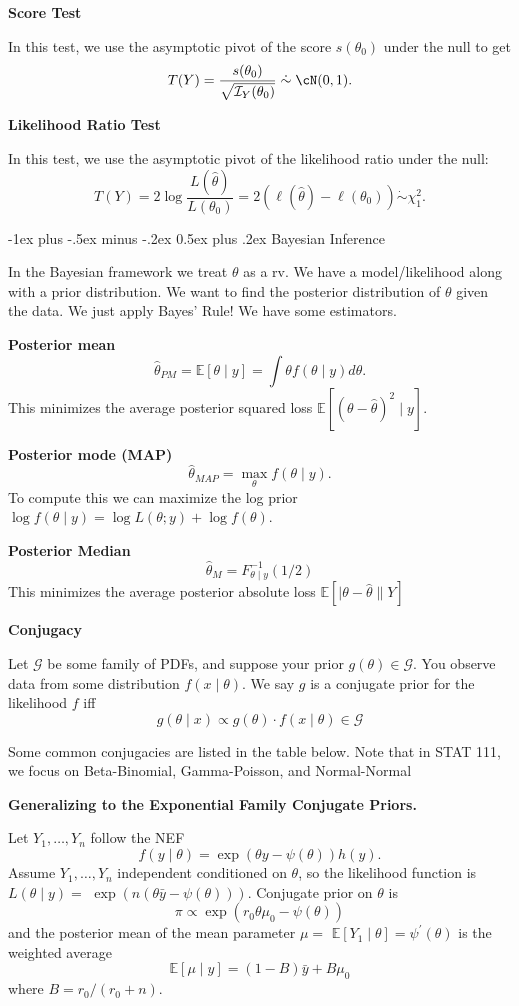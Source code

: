 \documentclass[10pt,landscape]{article}
\makeatletter
\renewcommand{\section}{\@startsection{section}{1}{0mm}%
                                {-1ex plus -.5ex minus -.2ex}%
                                {0.5ex plus .2ex}%
                                {\normalfont\large\bfseries}}
\makeatother
\begin{document}
\begin{multicols*}{3}
\textbf{Score Test}

In this test, we use the asymptotic pivot of the score $s(\theta_0)$ under the null to get $$T(Y)=\frac{s(\theta_0)}{\sqrt{\mathcal{I}_Y(\theta_0)}}\mathrel{\dot\sim} \cN(0,1).$$

\textbf{Likelihood Ratio Test}

In this test, we use the asymptotic pivot of the likelihood ratio under the null: $$T(Y)=2\log \frac{L(\hat{\theta})}{L(\theta_0)}=2(\ell(\hat{\theta})-\ell(\theta_0))\mathrel{\dot\sim} \chi_1^2.$$



\section{Bayesian Inference}

In the Bayesian framework we treat $\theta$ as a rv. We have a model/likelihood along with a prior distribution. We want to find the posterior distribution of $\theta$ given the data. We just apply Bayes' Rule! We have some estimators.

\textbf{Posterior mean}
$$
\hat{\theta}_{P M}=\mathbb{E}[\theta \mid y]=\int \theta f(\theta \mid y) d \theta .
$$
This minimizes the average posterior squared loss $\mathbb{E}\left[(\theta-\hat{\theta})^2 \mid y\right]$.

\textbf{Posterior mode (MAP)}
$$
\hat{\theta}_{M A P}=\max _\theta f(\theta \mid y) .
$$
To compute this we can maximize the log prior $\log f(\theta \mid y)=\log L(\theta ; y)+\log f(\theta)$.

\textbf{Posterior Median}
$$
\hat{\theta}_M=F_{\theta \mid y}^{-1}(1 / 2)
$$
This minimizes the average posterior absolute loss $\mathbb{E}[\mid \theta-\hat{\theta} \| Y]$

\textbf{Conjugacy}

Let $\mathcal{G}$ be some family of PDFs, and suppose your prior $g(\theta) \in \mathcal{G}$. You observe data from some distribution $f(x \mid \theta)$. We say $g$ is a conjugate prior for the likelihood $f$ iff
$$
g(\theta \mid x) \propto g(\theta) \cdot f(x \mid \theta) \in \mathcal{G}
$$

Some common conjugacies are listed in the table below. Note that in STAT 111, we focus on Beta-Binomial, Gamma-Poisson, and Normal-Normal

\textbf{Generalizing to the Exponential Family Conjugate Priors. }

Let $Y_1, \ldots, Y_n$ follow the NEF
$$
f(y \mid \theta)=\exp (\theta y-\psi(\theta)) h(y) .
$$
Assume $Y_1, \ldots, Y_n$ independent conditioned on $\theta$, so the likelihood function is $L(\theta \mid y)=$ $\exp (n(\theta \bar{y}-\psi(\theta)))$. Conjugate prior on $\theta$ is
$$
\pi \propto \exp \left(r_0 \theta \mu_0-\psi(\theta)\right)
$$
and the posterior mean of the mean parameter $\mu=$ $\mathbb{E}\left[Y_1 \mid \theta\right]=\psi^{\prime}(\theta)$ is the weighted average
$$
\mathbb{E}[\mu \mid y]=(1-B) \bar{y}+B \mu_0
$$
where $B=r_0 /\left(r_0+n\right)$.


\end{multicols*}
\end{document}
